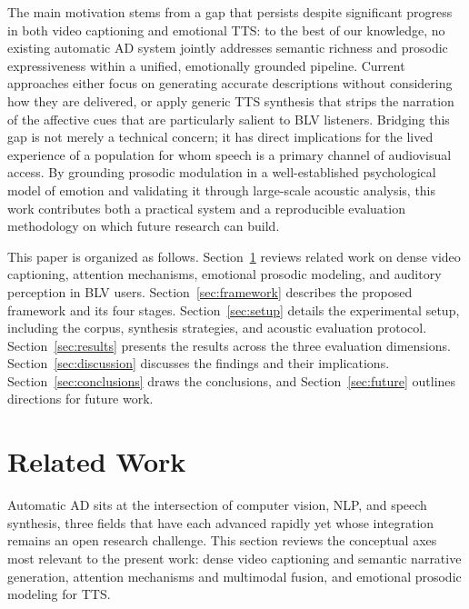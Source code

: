 \documentclass[pdflatex,iicol,sn-mathphys-num]{sn-jnl}%
\theoremstyle{thmstyleone}%
\theoremstyle{thmstyletwo}%
\theoremstyle{thmstylethree}%
\begin{document}
The main motivation stems from a gap that persists despite significant progress in both video captioning and emotional TTS: to the best of our knowledge, no existing automatic AD system jointly addresses semantic richness and prosodic expressiveness within a unified, emotionally grounded pipeline. Current approaches either focus on generating accurate descriptions without considering how they are delivered, or apply generic TTS synthesis that strips the narration of the affective cues that are particularly salient to BLV listeners. Bridging this gap is not merely a technical concern; it has direct implications for the lived experience of a population for whom speech is a primary channel of audiovisual access. By grounding prosodic modulation in a well-established psychological model of emotion and validating it through large-scale acoustic analysis, this work contributes both a practical system and a reproducible evaluation methodology on which future research can build.

This paper is organized as follows. Section~\ref{sec:related} reviews related work on dense video captioning, attention mechanisms, emotional prosodic modeling, and auditory perception in BLV users. Section~\ref{sec:framework} describes the proposed framework and its four stages. Section~\ref{sec:setup} details the experimental setup, including the corpus, synthesis strategies, and acoustic evaluation protocol. Section~\ref{sec:results} presents the results across the three evaluation dimensions. Section~\ref{sec:discussion} discusses the findings and their implications. Section~\ref{sec:conclusions} draws the conclusions, and Section~\ref{sec:future} outlines directions for future work.

\section{Related Work}
\label{sec:related}

Automatic AD sits at the intersection of computer vision, NLP, and speech synthesis, three fields that have each advanced rapidly yet whose integration remains an open research challenge. This section reviews the conceptual axes most relevant to the present work: dense video captioning and semantic narrative generation, attention mechanisms and multimodal fusion, and emotional prosodic modeling for TTS.
\end{document}

